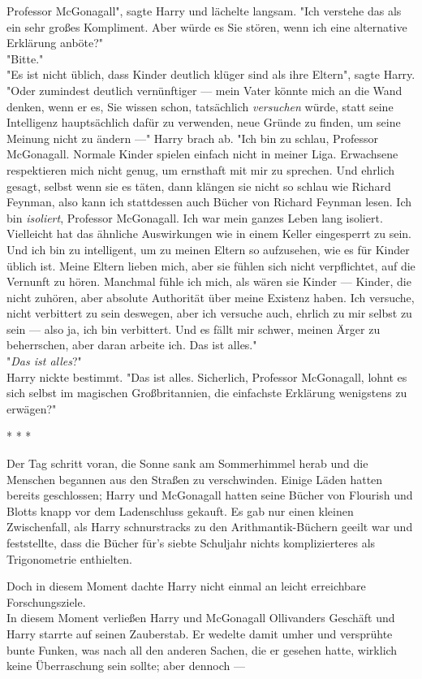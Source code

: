 {Professor McGonagall", sagte Harry und lächelte langsam. "Ich verstehe das als ein sehr großes Kompliment. Aber würde es Sie stören, wenn ich eine alternative Erklärung anböte?"\\ "Bitte."\\ "Es ist nicht üblich, dass Kinder deutlich klüger sind als ihre Eltern", sagte Harry. "Oder zumindest deutlich vernünftiger --- mein Vater könnte mich an die Wand denken, wenn er es, Sie wissen schon, tatsächlich \emph{versuchen} würde, statt seine Intelligenz hauptsächlich dafür zu verwenden, neue Gründe zu finden, um seine Meinung nicht zu ändern ---" Harry brach ab. "Ich bin zu schlau, Professor McGonagall. Normale Kinder spielen einfach nicht in meiner Liga. Erwachsene respektieren mich nicht genug, um ernsthaft mit mir zu sprechen. Und ehrlich gesagt, selbst wenn sie es täten, dann klängen sie nicht so schlau wie Richard Feynman, also kann ich stattdessen auch Bücher von Richard Feynman lesen. Ich bin \emph{isoliert}, Professor McGonagall. Ich war mein ganzes Leben lang isoliert. Vielleicht hat das ähnliche Auswirkungen wie in einem Keller eingesperrt zu sein. Und ich bin zu intelligent, um zu meinen Eltern so aufzusehen, wie es für Kinder üblich ist. Meine Eltern lieben mich, aber sie fühlen sich nicht verpflichtet, auf die Vernunft zu hören. Manchmal fühle ich mich, als wären sie Kinder --- Kinder, die nicht zuhören, aber absolute Authorität über meine Existenz haben. Ich versuche, nicht verbittert zu sein deswegen, aber ich versuche auch, ehrlich zu mir selbst zu sein --- also ja, ich bin verbittert. Und es fällt mir schwer, meinen Ärger zu beherrschen, aber daran arbeite ich. Das ist alles."\\ "\emph{Das ist alles}?"\\ Harry nickte bestimmt. "Das ist alles. Sicherlich, Professor McGonagall, lohnt es sich selbst im magischen Großbritannien, die einfachste Erklärung wenigstens zu erwägen?"

* * *

Der Tag schritt voran, die Sonne sank am Sommerhimmel herab und die Menschen begannen aus den Straßen zu verschwinden. Einige Läden hatten bereits geschlossen; Harry und McGonagall hatten seine Bücher von Flourish und Blotts knapp vor dem Ladenschluss gekauft. Es gab nur einen kleinen Zwischenfall, als Harry schnurstracks zu den Arithmantik-Büchern geeilt war und feststellte, dass die Bücher für's siebte Schuljahr nichts komplizierteres als Trigonometrie enthielten.

Doch in diesem Moment dachte Harry nicht einmal an leicht erreichbare Forschungsziele.\\ In diesem Moment verließen Harry und McGonagall Ollivanders Geschäft und Harry starrte auf seinen Zauberstab. Er wedelte damit umher und versprühte bunte Funken, was nach all den anderen Sachen, die er gesehen hatte, wirklich keine Überraschung sein sollte; aber dennoch ---

}
